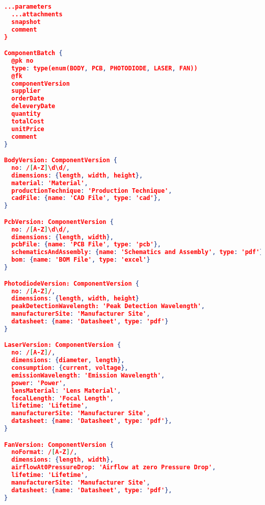 \begin{lstlisting}[language={JSON}, caption={版本管理模块的数据字典}]
  ...parameters
  ...attachments
  snapshot
  comment
}

ComponentBatch {
  @pk no
  type: type(enum(BODY, PCB, PHOTODIODE, LASER, FAN))
  @fk
  componentVersion
  supplier
  orderDate
  deleveryDate
  quantity
  totalCost
  unitPrice
  comment
}

BodyVersion: ComponentVersion {
  no: /[A-Z]\d\d/,
  dimensions: {length, width, height},
  material: 'Material',
  productionTechnique: 'Production Technique',
  cadFile: {name: 'CAD File', type: 'cad'},
}

PcbVersion: ComponentVersion {
  no: /[A-Z]\d\d/,
  dimensions: {length, width},
  pcbFile: {name: 'PCB File', type: 'pcb'},
  schematicsAndAssembly: {name: 'Schematics and Assembly', type: 'pdf'},
  bom: {name: 'BOM File', type: 'excel'}
}

PhotodiodeVersion: ComponentVersion {
  no: /[A-Z]/,
  dimensions: {length, width, height}
  peakDetectionWavelength: 'Peak Detection Wavelength',
  manufacturerSite: 'Manufacturer Site',
  datasheet: {name: 'Datasheet', type: 'pdf'}
}

LaserVersion: ComponentVersion {
  no: /[A-Z]/,
  dimensions: {diameter, length},
  consumption: {current, voltage},
  emissionWavelength: 'Emission Wavelength',
  power: 'Power',
  lensMaterial: 'Lens Material',
  focalLength: 'Focal Length',
  lifetime: 'Lifetime',
  manufacturerSite: 'Manufacturer Site',
  datasheet: {name: 'Datasheet', type: 'pdf'},
}

FanVersion: ComponentVersion {
  noFormat: /[A-Z]/,
  dimensions: {length, width},
  airflowAt0PressureDrop: 'Airflow at zero Pressure Drop',
  lifetime: 'Lifetime',
  manufacturerSite: 'Manufacturer Site',
  datasheet: {name: 'Datasheet', type: 'pdf'},
}

\end{lstlisting}              